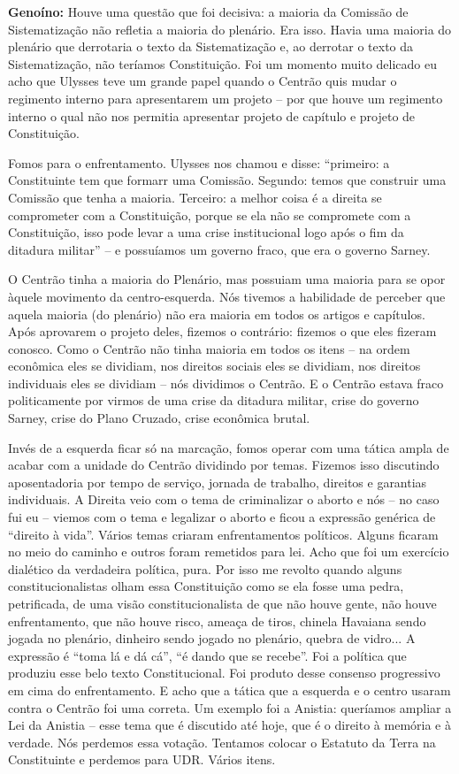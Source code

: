 \textbf{Genoíno:} Houve uma questão que foi decisiva: a maioria da
Comissão de Sistematização não refletia a maioria do plenário. Era isso.
Havia uma maioria do plenário que derrotaria o texto da Sistematização
e, ao derrotar o texto da Sistematização, não teríamos Constituição. Foi
um momento muito delicado eu acho que Ulysses teve um grande papel
quando o Centrão quis mudar o regimento interno para apresentarem um
projeto -- por que houve um regimento interno o qual não nos permitia
apresentar projeto de capítulo e projeto de Constituição.

Fomos para o enfrentamento. Ulysses nos chamou e disse: ``primeiro: a
Constituinte tem que formarr uma Comissão. Segundo: temos que construir
uma Comissão que tenha a maioria. Terceiro: a melhor coisa é a direita
se comprometer com a Constituição, porque se ela não se compromete com a
Constituição, isso pode levar a uma crise institucional logo após o fim
da ditadura militar'' -- e possuíamos um governo fraco, que era o
governo Sarney.

O Centrão tinha a maioria do Plenário, mas possuiam uma maioria para se
opor àquele movimento da centro-esquerda. Nós tivemos a habilidade de
perceber que aquela maioria (do plenário) não era maioria em todos os
artigos e capítulos. Após aprovarem o projeto deles, fizemos o
contrário: fizemos o que eles fizeram conosco. Como o Centrão não tinha
maioria em todos os itens -- na ordem econômica eles se dividiam, nos
direitos sociais eles se dividiam, nos direitos individuais eles se
dividiam -- nós dividimos o Centrão. E o Centrão estava fraco
politicamente por virmos de uma crise da ditadura militar, crise do
governo Sarney, crise do Plano Cruzado, crise econômica brutal.

Invés de a esquerda ficar só na marcação, fomos operar com uma tática
ampla de acabar com a unidade do Centrão dividindo por temas. Fizemos
isso discutindo aposentadoria por tempo de serviço, jornada de trabalho,
direitos e garantias individuais. A Direita veio com o tema de
criminalizar o aborto e nós -- no caso fui eu -- viemos com o tema e
legalizar o aborto e ficou a expressão genérica de ``direito à vida''.
Vários temas criaram enfrentamentos políticos. Alguns ficaram no meio do
caminho e outros foram remetidos para lei. Acho que foi um exercício
dialético da verdadeira política, pura. Por isso me revolto quando
alguns constitucionalistas olham essa Constituição como se ela fosse uma
pedra, petrificada, de uma visão constitucionalista de que não houve
gente, não houve enfrentamento, que não houve risco, ameaça de tiros,
chinela Havaiana sendo jogada no plenário, dinheiro sendo jogado no
plenário, quebra de vidro... A expressão é ``toma lá e dá cá'', ``é
dando que se recebe''. Foi a política que produziu esse belo texto
Constitucional. Foi produto desse consenso progressivo em cima do
enfrentamento. E acho que a tática que a esquerda e o centro usaram
contra o Centrão foi uma correta. Um exemplo foi a Anistia: queríamos
ampliar a Lei da Anistia -- esse tema que é discutido até hoje, que é o
direito à memória e à verdade. Nós perdemos essa votação. Tentamos
colocar o Estatuto da Terra na Constituinte e perdemos para UDR. Vários
itens.

